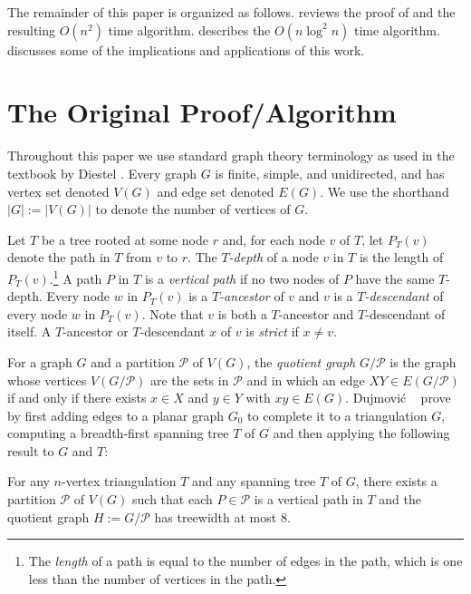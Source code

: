 \documentclass[kpfonts]{patmorin}
\begin{document}
The remainder of this paper is organized as follows.  reviews the proof of  and the resulting $O(n^2)$ time algorithm.   describes the $O(n\log^2 n)$ time algorithm.   discusses some of the implications and applications of this work.


\section{The Original Proof/Algorithm}

Throughout this paper we use standard graph theory terminology as used in the textbook by Diestel \cite{diestel:graph}.  Every graph $G$ is finite, simple, and unidirected, and has vertex set denoted $V(G)$ and edge set denoted $E(G)$. We use the shorthand $|G|:=|V(G)|$ to denote the number of vertices of $G$.

Let $T$ be a tree rooted at some node $r$ and, for each node $v$ of $T$, let $P_T(v)$ denote the path in $T$ from $v$ to $r$.  The \emph{$T$-depth} of a node $v$ in $T$ is the length of $P_T(v)$.\footnote{The \emph{length} of a path is equal to the number of edges in the path, which is one less than the number of vertices in the path.}  A path $P$ in $T$ is a \emph{vertical path} if no two nodes of $P$ have the same $T$-depth.  Every node $w$ in $P_T(v)$ is a \emph{$T$-ancestor} of $v$ and $v$ is a \emph{$T$-descendant} of every node $w$ in $P_T(v)$.  Note that $v$ is both a $T$-ancestor and $T$-descendant of itself.  A $T$-ancestor or $T$-descendant $x$ of $v$ is \emph{strict} if $x\neq v$.

For a graph $G$ and a partition $\mathcal{P}$ of $V(G)$, the \emph{quotient graph} $G/\mathcal{P}$ is the graph whose vertices $V(G/\mathcal{P})$ are the sets in $\mathcal{P}$ and in which an edge $XY\in E(G/\mathcal{P})$ if and only if there exists $x\in X$ and $y\in Y$ with $xy\in E(G)$.  Dujmović \etal\  \cite{dujmovic.joret.ea:planar} prove  by first adding edges to a planar graph $G_0$ to complete it to a triangulation $G$, computing a breadth-first spanning tree $T$ of $G$ and then applying the following result to $G$ and $T$:

\begin{thm}
  For any $n$-vertex triangulation $T$ and any spanning tree $T$ of $G$, there exists a partition $\mathcal{P}$ of $V(G)$ such that each $P\in\mathcal{P}$ is a vertical path in $T$ and the quotient graph $H:=G/\mathcal{P}$ has treewidth at most $8$.
\end{thm}
\end{document}
